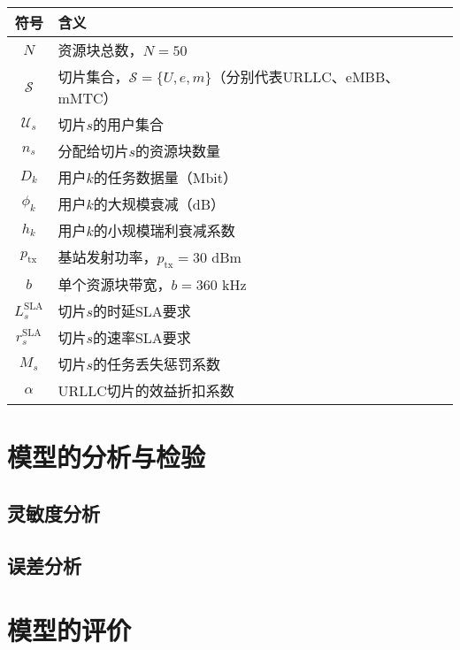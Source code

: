 \documentclass[withoutpreface,bwprint]{cumcmthesis}
\begin{document}
\begin{table}[H]
\centering
\begin{tabular}{cl}
\hline
符号 & 含义 \\
\hline
$N$ & 资源块总数，$N = 50$ \\
$\mathcal{S}$ & 切片集合，$\mathcal{S} = \{U, e, m\}$（分别代表URLLC、eMBB、mMTC） \\
$\mathcal{U}_s$ & 切片$s$的用户集合 \\
$n_s$ & 分配给切片$s$的资源块数量 \\
$D_k$ & 用户$k$的任务数据量（Mbit） \\
$\phi_{k}$ & 用户$k$的大规模衰减（dB） \\
$h_{k}$ & 用户$k$的小规模瑞利衰减系数 \\
$p_{\text{tx}}$ & 基站发射功率，$p_{\text{tx}} = 30$ dBm \\
$b$ & 单个资源块带宽，$b = 360$ kHz \\
$L_s^{\text{SLA}}$ & 切片$s$的时延SLA要求 \\
$r_s^{\text{SLA}}$ & 切片$s$的速率SLA要求 \\
$M_s$ & 切片$s$的任务丢失惩罚系数 \\
$\alpha$ & URLLC切片的效益折扣系数 \\
\hline
\end{tabular}
\end{table}








\section{模型的分析与检验}

\subsection{灵敏度分析}

\subsection{误差分析}


\section{模型的评价}
\end{document}
